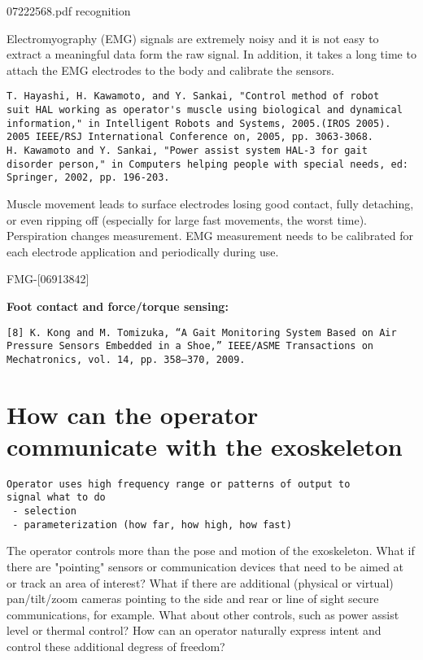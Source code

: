 \documentclass[letterpaper,12pt,fullpage]{article}
\begin{document}
07222568.pdf recognition

Electromyography (EMG)
signals are extremely noisy and it is not easy to extract a
meaningful data form the raw signal. In addition, it takes a long
time to attach the EMG electrodes to the body and calibrate the
sensors.
\begin{verbatim}
T. Hayashi, H. Kawamoto, and Y. Sankai, "Control method of robot
suit HAL working as operator's muscle using biological and dynamical
information," in Intelligent Robots and Systems, 2005.(IROS 2005).
2005 IEEE/RSJ International Conference on, 2005, pp. 3063-3068.
H. Kawamoto and Y. Sankai, "Power assist system HAL-3 for gait
disorder person," in Computers helping people with special needs, ed:
Springer, 2002, pp. 196-203.
\end{verbatim}

Muscle movement leads to surface electrodes losing good contact, fully detaching, or
even ripping off (especially for large fast
movements, the worst time).
Perspiration changes measurement. EMG measurement
needs to be calibrated for each electrode application and periodically during use.

FMG-[06913842]

{\bf Foot contact and force/torque sensing:}
\begin{verbatim}
[8] K. Kong and M. Tomizuka, “A Gait Monitoring System Based on Air
Pressure Sensors Embedded in a Shoe,” IEEE/ASME Transactions on
Mechatronics, vol. 14, pp. 358–370, 2009.
\end{verbatim}

\section{How can the operator communicate with the exoskeleton}

\begin{verbatim}
Operator uses high frequency range or patterns of output to
signal what to do
 - selection
 - parameterization (how far, how high, how fast)
\end{verbatim}

The operator controls more than the pose and motion of the
exoskeleton. What if there are "pointing" sensors or communication
devices that need to be aimed at or track an area of interest? What if
there are additional (physical or virtual) pan/tilt/zoom cameras
pointing to the side and rear or line of sight secure communications,
for example. What about other controls, such as power assist level or
thermal control? How can an operator naturally express intent and
control these additional degress of freedom?
\end{document}
